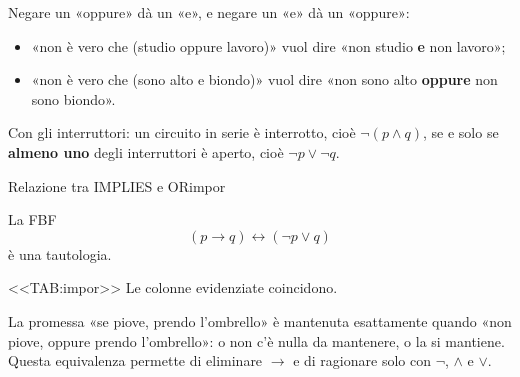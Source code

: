 \begin{spiegazione}
    Negare un «oppure» dà un «e», e negare un «e» dà un «oppure»:
    \begin{itemize}
        \item «non è vero che (studio oppure lavoro)» vuol dire «non studio \textbf{e} non lavoro»;
        \item «non è vero che (sono alto e biondo)» vuol dire «non sono alto \textbf{oppure} non sono biondo».
    \end{itemize}
    Con gli interruttori: un circuito in serie è interrotto, cioè $\neg(p \wedge q)$, se e solo se \textbf{almeno uno} degli interruttori è aperto, cioè $\neg p \vee \neg q$.
\end{spiegazione}


\begin{concetto}
\begin{Proposizione}{Relazione tra IMPLIES e OR}{impor}
    \begin{prerequisiti}
    \end{prerequisiti}
    La FBF
    \[ (p \rightarrow q) \leftrightarrow (\neg p \vee q) \]
    è una tautologia.
\end{Proposizione}

\begin{dimostrazione}
    <<TAB:impor>>
    Le colonne evidenziate coincidono.
\end{dimostrazione}
\end{concetto}

\begin{spiegazione}
    La promessa «se piove, prendo l'ombrello» è mantenuta esattamente quando «non piove, oppure prendo l'ombrello»: o non c'è nulla da mantenere,
    o la si mantiene. Questa equivalenza permette di eliminare $\rightarrow$ e di ragionare solo con $\neg$, $\wedge$ e $\vee$.
\end{spiegazione}


